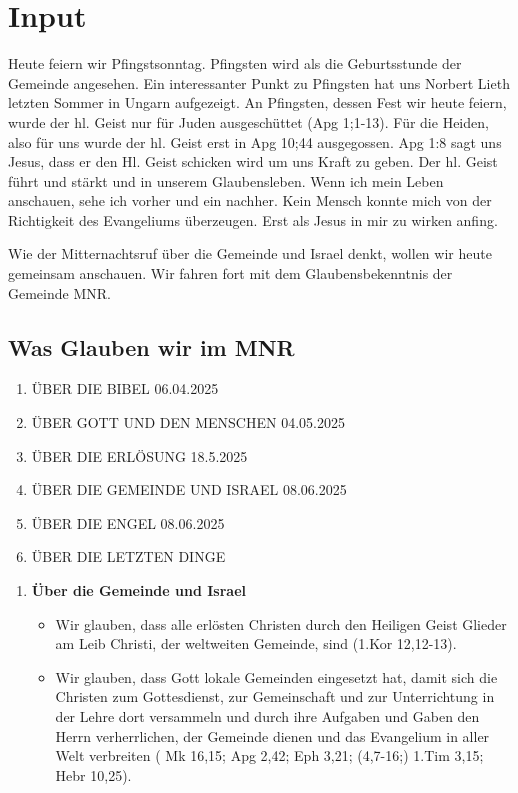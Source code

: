 \documentclass{../../inc/mybib}
\begin{document}
\section{ Input }
\begin{spacing}{1.5}
Heute feiern wir Pfingstsonntag. Pfingsten wird als die Geburtsstunde der Gemeinde angesehen.  Ein interessanter Punkt zu Pfingsten hat uns Norbert Lieth letzten Sommer in Ungarn aufgezeigt. An Pfingsten, dessen Fest wir heute feiern, wurde der hl. Geist nur für Juden ausgeschüttet (Apg 1;1-13). Für die Heiden, also für uns wurde der hl. Geist erst in Apg 10;44 ausgegossen. Apg 1:8 sagt uns Jesus, dass er den Hl. Geist schicken wird um uns Kraft zu geben. Der hl. Geist führt und stärkt und in unserem Glaubensleben. Wenn ich mein Leben anschauen, sehe ich vorher und ein nachher. Kein Mensch konnte mich von der Richtigkeit des Evangeliums überzeugen. Erst als Jesus in mir zu wirken anfing.

Wie der Mitternachtsruf über die Gemeinde und Israel denkt, wollen wir heute gemeinsam anschauen. Wir fahren fort mit dem Glaubensbekenntnis der Gemeinde MNR.

\subsection{Was Glauben wir im MNR}
    \begin{enumerate}
        \item \uppercase{über die bibel} 06.04.2025
        \item \uppercase{über gott und den Menschen} 04.05.2025
        \item \uppercase{über die Erlösung} 18.5.2025
        \item \uppercase{über die Gemeinde und Israel} 08.06.2025
        \item \uppercase{über die Engel} 08.06.2025
        \item \uppercase{über die letzten Dinge}
    \end{enumerate}
    \begin{enumerate}      
      \item \textbf{Über die Gemeinde und Israel} 
        \begin{itemize}
            \item Wir glauben, dass alle erlösten Christen durch den Heiligen Geist Glieder am Leib Christi, der weltweiten Gemeinde, sind (1.Kor 12,12-13).
            
            \item Wir glauben, dass Gott lokale Gemeinden eingesetzt hat, damit sich die Christen zum Gottesdienst, zur Gemeinschaft und zur Unterrichtung in der Lehre dort versammeln und durch ihre Aufgaben und Gaben den Herrn verherrlichen, der Gemeinde dienen und das Evangelium in aller Welt verbreiten (
            Mk 16,15; 
            Apg 2,42;
            Eph 3,21; (4,7-16;)
            1.Tim 3,15;
            Hebr 10,25).
            

\end{itemize}
\end{enumerate}
\end{spacing}
\end{document}
